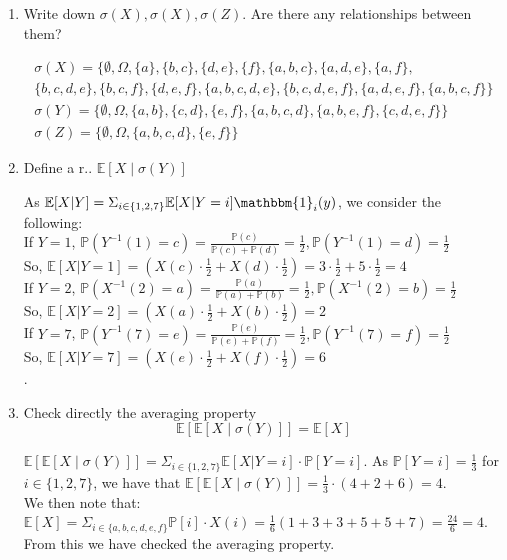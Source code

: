 \documentclass[12pt,twoside, letter]{exam}
\theoremstyle{definition}
\newcommand{\ee}{\mathbb{E}}
\newcommand{\pp}{\mathbb{P}}
\newcommand{\id}{\mathbbm{1}}
\begin{document}
\begin{enumerate}
  \item Write down $\sigma(X), \sigma(X), \sigma(Z)$. Are there any relationships between them?
    \begin{solution}
      \begin{multline*}
        \sigma(X) = \{\emptyset, \Omega, \{a\}, \{b,c\}, \{d,e\}, \{f\}, \{a,b,c\}, \{a,d,e\}, \{a,f\}, \\
            \{b,c,d,e\}, \{b,c,f\}, \{d,e,f\},
            \{a,b,c,d,e\}, \{b,c,d,e,f\}, \{a,d,e,f\}, \{a,b,c,f\}\} \\
        \sigma(Y) = \{\emptyset, \Omega, \{a,b\}, \{c,d\}, \{e,f\}, \{a,b,c,d\}, \{a,b,e,f\}, \{c,d,e,f\}\}\\
        \sigma(Z) = \{ \emptyset, \Omega, \{a,b,c,d\}, \{e,f\} \}
      \end{multline*}
    \end{solution}
  \item Define a r.. $\ee[X \mid \sigma(Y)]$
    \begin{solution}
      As $\ee[X|Y] = \Sigma_{i \in \{1,2,7\}} \ee[X|Y = i]\id_{i}(y)$, we consider the following: \\
      If $Y = 1$, $\pp(Y^{-1}(1) = c) = \frac{\pp(c)}{\pp(c) + \pp(d)} = \frac{1}{2}, \pp(Y^{-1}(1) = d) = \frac{1}{2}$\\
      So, $\ee[X|Y = 1] = (X(c) \cdot \frac{1}{2} + X(d) \cdot \frac{1}{2}) = 3\cdot \frac{1}{2} + 5\cdot \frac{1}{2}
      = 4$ \\
      If $Y = 2$, $\pp(X^{-1}(2) = a) = \frac{\pp(a)}{\pp(a) + \pp(b)} = \frac{1}{2}, \pp(X^{-1}(2) = b) = \frac{1}{2}$\\
      So, $\ee[X|Y = 2] = (X(a) \cdot \frac{1}{2} + X(b) \cdot \frac{1}{2}) = 2$ \\
      If $Y = 7$, $\pp(Y^{-1}(7) = e) = \frac{\pp(e)}{\pp(e) + \pp(f)} = \frac{1}{2}, \pp(Y^{-1}(7) = f) = \frac{1}{2}$ \\
      So, $\ee[X|Y = 7] = (X(e) \cdot \frac{1}{2} + X(f) \cdot \frac{1}{2}) = 6$ \\.
    \end{solution}
  \item Check directly the averaging property
    \begin{equation*}
      \ee[\ee[X \mid \sigma(Y)]] = \ee[X]
    \end{equation*}

    \begin{solution}
      $\ee[\ee[X \mid \sigma(Y)]] = \Sigma_{i \in \{1,2,7\}} \ee[X|Y=i] \cdot \pp[Y=i]$. As $\pp[Y=i] = \frac{1}{3}$ for $i \in \{1,2,7\}$, we have that
      $\ee[\ee[X \mid \sigma(Y)]] = \frac{1}{3}\cdot (4 + 2 + 6) = 4$. \\
      We then note that: \\
      $\ee[X] = \Sigma_{i \in \{a,b,c,d,e,f\}} \pp[i] \cdot X(i) = \frac{1}{6}(1+3+3+5+5+7) = \frac{24}{6} = 4$. \\
      From this we have checked the averaging property.
    \end{solution}
\end{enumerate}
\end{document}
